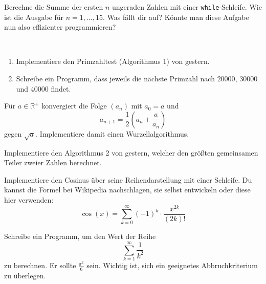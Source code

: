 \documentclass{uebungszettel}
\begin{document}
\begin{aufg}
Berechne die Summe der ersten $n$ ungeraden Zahlen mit einer \texttt{while}-Schleife. Wie ist die Ausgabe für $n = 1, \ldots ,15$. Was fällt dir auf? Könnte man diese Aufgabe nun also effizienter programmieren?
\end{aufg}

\begin{aufg}~
\begin{enumerate}
\item Implementiere den Primzahltest (Algorithmus 1) von gestern.
\item Schreibe ein Programm, dass jeweils die nächste Primzahl nach $20000$, $30000$ und $40000$ findet.
\end{enumerate}
\end{aufg}

\begin{aufg}
Für $a \in \mathbb{R}^+$ konvergiert die Folge $(a_n)$ mit $a_0 = a$ und
\[ a_{n+1} = \frac{1}{2}\left(a_n + \frac{a}{a_n}\right) \]
gegen $\sqrt{a}$. Implementiere damit einen Wurzellalgorithmus.
\end{aufg}

\begin{aufg}
Implementiere den Algorithmus 2 von gestern, welcher den größten gemeinsamen Teiler zweier Zahlen berechnet.
\end{aufg}

\begin{aufg}
Implementiere den Cosinus über seine Reihendarstellung mit einer Schleife. Du kannst die Formel bei Wikipedia nachschlagen, sie selbst entwickeln oder diese hier verwenden:
\[ \cos(x) = \sum_{k = 0}^{\infty}{(-1)^k \cdot \frac{x^{2k}}{(2k)!}} \]
\end{aufg}

\begin{aufg}
Schreibe ein Programm, um den Wert der Reihe
\[ \sum_{k = 1}^\infty \frac{1}{k^2} \]
zu berechnen. Er sollte $\frac{\pi^2}{6}$ sein. Wichtig ist, sich ein geeignetes Abbruchkriterium zu überlegen.
\end{aufg}
\end{document}
